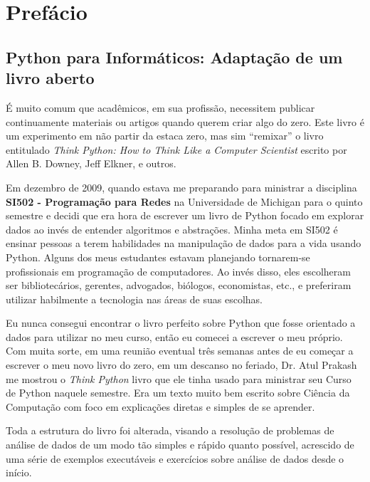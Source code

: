 
\chapter{Prefácio}

\section*{Python para Informáticos: Adaptação de um livro aberto}

É muito comum que acadêmicos, em sua profissão, necessitem publicar continuamente 
materiais ou artigos quando querem criar algo do zero. 
Este livro é um experimento em não partir da estaca zero, mas sim ``remixar''
o livro entitulado \emph{Think Python: How to Think Like
a Computer Scientist} escrito por Allen B. Downey, Jeff Elkner, e outros.

Em dezembro de 2009, quando estava me preparando para ministrar a disciplina
{\bf SI502 - Programação para Redes} na Universidade de Michigan
para o quinto semestre e decidi que era hora de escrever um livro de Python 
focado em explorar dados ao invés de entender algoritmos e 
abstrações.
Minha meta em SI502 é ensinar pessoas a terem habilidades na manipulação de dados 
para a vida usando Python.  Alguns dos meus estudantes estavam planejando tornarem-se 
profissionais em programação de computadores.  Ao invés disso, eles
escolheram ser bibliotecários, gerentes, advogados, biólogos, economistas, etc., 
e preferiram utilizar habilmente a tecnologia nas áreas de suas escolhas.

Eu nunca consegui encontrar o livro perfeito sobre Python que fosse orientado a dados
para utilizar no meu curso, então eu comecei a escrever o meu próprio. Com muita sorte, em 
uma reunião eventual três semanas antes de eu começar a escrever o meu novo livro do zero, 
em um descanso no feriado, Dr. Atul Prakash me mostrou o \emph{Think Python} livro que ele tinha
usado para ministrar seu Curso de Python naquele semestre.
Era um texto muito bem escrito sobre Ciência da Computação com foco em
explicações diretas e simples de se aprender.

Toda a estrutura do livro foi alterada, visando a resolução de problemas de análise de 
dados de um modo tão simples e rápido quanto possível, acrescido de uma série de exemplos 
executáveis e exercícios sobre análise de dados desde o início.

